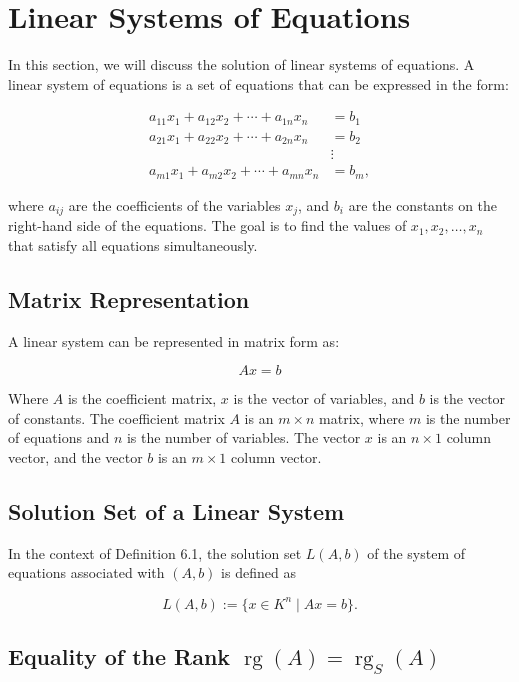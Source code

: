 \newpage
\section{Linear Systems of Equations}

In this section, we will discuss the solution of linear systems of equations. A linear system of 
equations is a set of equations that can be expressed in the form:

\begin{align*}
	a_{11}x_1 + a_{12}x_2 + \cdots + a_{1n}x_n & = b_1  \\
	a_{21}x_1 + a_{22}x_2 + \cdots + a_{2n}x_n & = b_2  \\
	& \vdots \\
	a_{m1}x_1 + a_{m2}x_2 + \cdots + a_{mn}x_n & = b_m,
\end{align*}

where \( a_{ij} \) are the coefficients of the variables \( x_j \), and \( b_i \) are the constants 
on the right-hand side of the equations. The goal is to find the values of \( x_1, x_2, \ldots, x_n \) 
that satisfy all equations simultaneously.

\subsection{Matrix Representation}

A linear system can be represented in matrix form as:

\[
	A x = b
\]

Where \(A\) is the coefficient matrix, \(x\) is the vector of variables, and \(b\) is the vector 
of constants. The coefficient matrix \(A\) is an \( m \times n \) matrix, where \( m \) is the number 
of equations and \(n\) is the number of variables. The vector \(x\) is an \( n \times 1 \) column 
vector, and the vector \(b\) is an \( m \times 1 \) column vector. 


\subsection{Solution Set of a Linear System}

In the context of Definition 6.1, the solution set \( L(A, b) \) of the system of equations associated 
with \( (A, b) \) is defined as

\[
	L(A, b) := \{ x \in K^n \mid Ax = b \}.
\]

\subsection{Equality of the Rank \texorpdfstring{\(\operatorname{rg}(A) = \operatorname{rg}_S(A)\)}{}}

